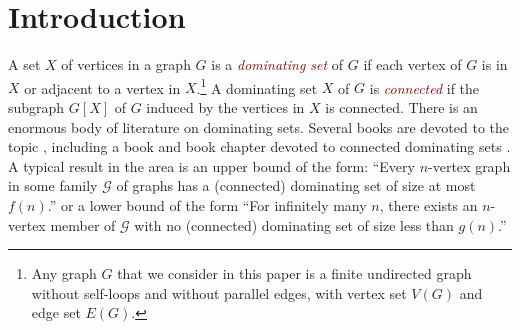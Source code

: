 \documentclass[11pt]{article}
\newcommand{\pat}[1]{\textcolor{red}{PM: #1}}
\newcommand{\R}{\mathbb{R}}
\newcommand{\defin}[1]{\emph{\textcolor{Maroon}{#1}}}
\theoremstyle{definition}
\newcommand{\vida}[1]{[{\color{pink}VD: #1}]}
\begin{document}
\begin{titlepage}
\begin{abstract}






  
  
  
\end{abstract}
\end{titlepage}

\section{Introduction}

A set $X$ of vertices in a graph $G$ is a \defin{dominating set} of $G$ if each vertex of $G$ is in $X$ or adjacent to a vertex in $X$.\footnote{Any graph $G$ that we consider in this paper is a finite undirected graph without self-loops and without parallel edges, with vertex set $V(G)$ and edge set $E(G)$.}  A dominating set $X$ of $G$ is \defin{connected} if the subgraph $G[X]$ of $G$ induced by the vertices in $X$ is connected.  There is an enormous body of literature on dominating sets. Several books are devoted to the topic \cite{haynes.hedetniemi.ea:domination,haynes.hedetniemi.ea:topics,du.wan:connected,haynes.hedetniemi.ea:vol2}, including a book and book chapter devoted to connected dominating sets \cite{du.wan:connected,chellali.favaron:connected}.
A typical result in the area is an upper bound of the form: ``Every $n$-vertex graph in some family $\mathcal{G}$ of graphs has a (connected) dominating set of size at most $f(n)$.'' or a lower bound of the form ``For infinitely many $n$, there exists an $n$-vertex member of $\mathcal{G}$ with no (connected) dominating set of size less than $g(n)$.''
\end{document}
